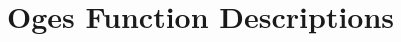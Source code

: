 \documentclass[11pt]{article}
\begin{document}
% 



\section{Oges Function Descriptions}




\end{document}
